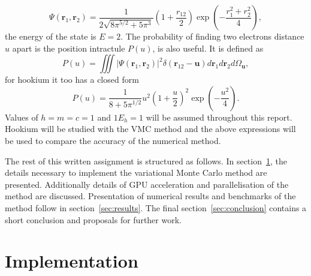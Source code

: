 \documentclass[final,3p,times,twocolumn]{elsarticle}
\begin{document}
	\begin{equation}
		\Psi\left(\mathbf{r}_{1}, \mathbf{r}_{2}\right)=\frac{1}{2 \sqrt{8 \pi^{5 / 2}+5 \pi^{3}}}\left(1+\frac{r_{12}}{2}\right) \exp \left(-\frac{r_{1}^{2}+r_{2}^{2}}{4}\right), 
	\end{equation}
	the energy of the state is $E=2$. 
	The probability of finding two electrons distance $u$ apart is the position intractule $P(u)$, is also useful. It is defined as
	\begin{equation}
		P(u)=\iiint\left|\Psi\left(\mathbf{r}_{1}, \mathbf{r}_{2}\right)\right|^{2} \delta\left(\mathbf{r}_{12}-\mathbf{u}\right) d \mathbf{r}_{1} d \mathbf{r}_{2} d \Omega_{\mathbf{u}},
	\end{equation}
	for hookium it too has a closed form
	\begin{equation}
		P(u)=\frac{1}{8+5 \pi^{1 / 2}} u^{2}\left(1+\frac{u}{2}\right)^{2} \exp \left(-\frac{u^{2}}{4}\right).
	\end{equation}
	Values of $h=m=c=1$ and $1E_h = 1$ will be assumed throughout this report. 
	Hookium will be studied with the VMC method and the above expressions will be used to compare the accuracy of the numerical method.
	
	The rest of this written assignment is structured as follows. In section~\ref{sec:impl}, the details necessary to implement the variational Monte Carlo method are presented. Additionally details of GPU acceleration and parallelisation of the method are discussed. Presentation of numerical results and benchmarks of the method follow in section~\ref{sec:results}. The final section~\ref{sec:conclusion} contains a short conclusion and proposals for further work. 
	\section{Implementation}
	\label{sec:impl}
	
\end{document}
